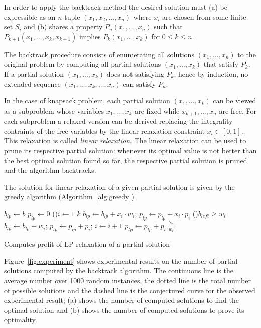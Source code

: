 \documentclass{article}
\begin{document}
In order to apply the backtrack method the desired solution must (a) be
expressible as an $n$-tuple $(x_1, x_2, \ldots, x_n)$ where $x_i$ are chosen
from some finite set $S_i$ and (b) shares a property $P_n(x_1, \ldots, x_n)$
such that $P_{k+1}(x_1, \ldots, x_k, x_{k+1})$ implies $P_{k}(x_1, \ldots, x_k)$
for $0 \leqslant k \leqslant n$.

The backtrack procedure consists of enumerating all solutions $(x_1, \ldots, x_n)$
to the original problem by computing all partial solutions $(x_1, \ldots, x_k)$
that satisfy $P_k$.
If a partial solution $(x_1, \ldots, x_k)$ does not satisfying $P_k$; hence by induction,
no extended sequence $(x_1, \ldots, x_k, \ldots, x_n)$ can satisfy $P_n$.

In the case of knapsack problem, each partial solution $(x_1, \ldots, x_k)$ can be
viewed as a subproblem whose variables $x_1, \ldots, x_k$ are fixed while $x_{k+1}, \ldots,
x_n$ are free.
For each subproblem a relaxed version can be derived
replacing the integrality contraints of the free variables
by the linear relaxation constraint $x_i \in [0, 1]$.
This relaxation is called {\it linear relaxation}.
The linear relaxation can be used to prune its respective partial solution:
whenever its optimal value is not better than the best optimal solution found so far,
the respective partial solution is pruned and the algorithm backtracks.

The solution for linear relaxation of a given partial solution is given by
the greedy algorithm (Algorithm~\ref{alg:greedy}).

\begin{algorithm}[H]
 $b_{lp} \leftarrow b$\;
 $p_{lp} \leftarrow 0$\;
 \For(){$i \leftarrow 1$ \KwTo $k$}{
 	$b_{lp} \leftarrow b_{lp} + x_i \cdot w_i$;
 	$p_{lp} \leftarrow p_{lp} + x_i \cdot p_i$\;
 }
 \While(){$b_{left} \geqslant w_i$}{
 	$b_{lp} \leftarrow b_{lp} + w_i$;
 	$p_{lp} \leftarrow p_{lp} + p_i$;
	$i \leftarrow i+1$\;
 }
 $p_{lp} \leftarrow p_{lp} + p_i.\frac{b_{lp}}{w_i}$
 \caption{Computes profit of LP-relaxation of a partial solution}
 \label{alg:greedy}
\end{algorithm}

Figure~\ref{fig:experiment} shows experimental results on the number of partial
solutions computed by the backtrack algorithm.
The continuous line is the average number over 1000 random instances,
the dotted line is the total number of possible solutions and
the dashed line is the conjectured curve for the observed experimental result;
(a) shows the number of computed solutions to find the optimal solution and
(b) shows the number of computed solutions to prove its optimality.
\end{document}
